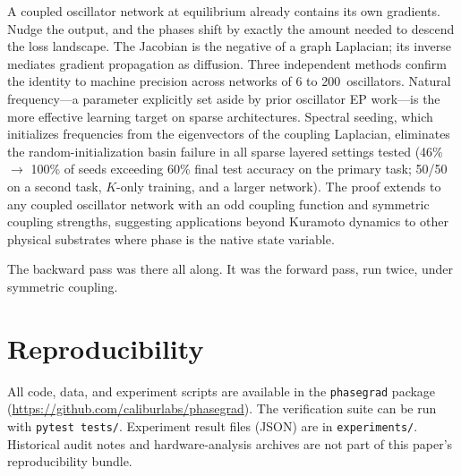 \documentclass[11pt,a4paper]{article}
\begin{document}
A coupled oscillator network at equilibrium already contains its own
gradients. Nudge the output, and the phases shift by exactly the amount
needed to descend the loss landscape. The Jacobian is the negative of a
graph Laplacian; its inverse mediates gradient propagation as diffusion. Three independent
methods confirm the identity to machine precision across networks of 6 to
200~oscillators. Natural frequency---a parameter explicitly set aside by prior oscillator EP work---is
the more effective learning target on sparse architectures. Spectral
seeding, which initializes frequencies from the eigenvectors of the
coupling Laplacian, eliminates the random-initialization basin failure
in all sparse layered settings tested (46\% $\to$ 100\% of seeds
exceeding 60\% final test accuracy on the primary task; 50/50 on a
second task, $K$-only training, and a larger network). The proof extends
to any coupled oscillator network with an odd coupling function and
symmetric coupling strengths, suggesting applications beyond Kuramoto
dynamics to other physical substrates where phase is the native state
variable.

The backward pass was there all along. It was the forward pass, run twice,
under symmetric coupling.

\section*{Reproducibility}

All code, data, and experiment scripts are available in the
\texttt{phasegrad} package (\url{https://github.com/caliburlabs/phasegrad}). The verification suite
can be run with \texttt{pytest tests/}. Experiment result files (JSON) are
in \texttt{experiments/}. Historical audit notes and hardware-analysis
archives are not part of this paper's reproducibility bundle.

\end{document}
